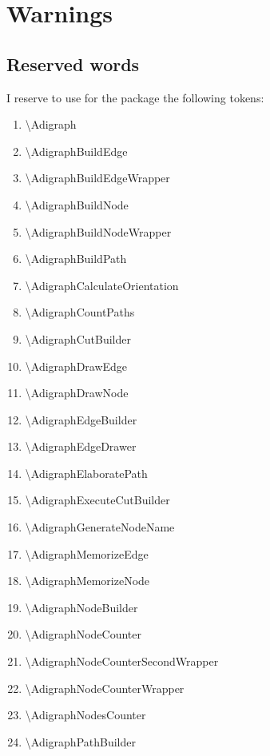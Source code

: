 \documentclass{report}
\begin{document}
\chapter{Warnings}
\section{Reserved words}
I reserve to use for the package the following tokens:

\begin{multicols}{2}
	\begin{enumerate}
		\item \textbackslash Adigraph
		\item \textbackslash AdigraphBuildEdge
		\item \textbackslash AdigraphBuildEdgeWrapper
		\item \textbackslash AdigraphBuildNode
		\item \textbackslash AdigraphBuildNodeWrapper
		\item \textbackslash AdigraphBuildPath
		\item \textbackslash AdigraphCalculateOrientation
		\item \textbackslash AdigraphCountPaths
		\item \textbackslash AdigraphCutBuilder
		\item \textbackslash AdigraphDrawEdge
		\item \textbackslash AdigraphDrawNode
		\item \textbackslash AdigraphEdgeBuilder
		\item \textbackslash AdigraphEdgeDrawer
		\item \textbackslash AdigraphElaboratePath
		\item \textbackslash AdigraphExecuteCutBuilder
		\item \textbackslash AdigraphGenerateNodeName
		\item \textbackslash AdigraphMemorizeEdge
		\item \textbackslash AdigraphMemorizeNode
		\item \textbackslash AdigraphNodeBuilder
		\item \textbackslash AdigraphNodeCounter
		\item \textbackslash AdigraphNodeCounterSecondWrapper
		\item \textbackslash AdigraphNodeCounterWrapper
		\item \textbackslash AdigraphNodesCounter
		\item \textbackslash AdigraphPathBuilder

\end{enumerate}
\end{multicols}
\end{document}

